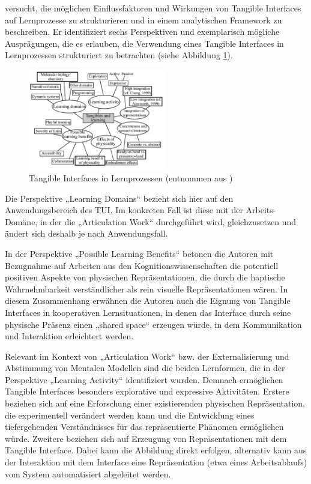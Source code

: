 \citet{Marshall07} versucht, die möglichen Einflussfaktoren und Wirkungen von Tangible Interfaces auf Lernprozesse zu strukturieren und in einem analytischen Framework zu beschreiben. Er identifiziert sechs Perspektiven und exemplarisch mögliche Ausprägungen, die es erlauben, die Verwendung eines Tangible Interfaces in Lernprozessen strukturiert zu betrachten (siehe Abbildung \ref{fig:img_ImplementierungUeberblick_marshall_tui_learning}). 

\begin{figure}[htbp]
	\centering
		\includegraphics[width=6cm]{img/ImplementierungUeberblick/marshall_tui_learning.png}
	\caption[Tangible Interfaces in Lernprozessen]{Tangible Interfaces in Lernprozessen (entnommen aus \citet{Marshall07})}
	\label{fig:img_ImplementierungUeberblick_marshall_tui_learning}
\end{figure}

Die Perspektive „Learning Domains“ bezieht sich hier auf den Anwendungsbereich des \gls{TUI}. Im konkreten Fall ist diese mit der Arbeits-Domäne, in der die „Articulation Work“ durchgeführt wird, gleichzusetzen und ändert sich deshalb je nach Anwendungsfall.

In der Perspektive „Possible Learning Benefits“ betonen die Autoren mit Bezugnahme auf Arbeiten aus den Kognitionswissenschaften die potentiell positiven Aspekte von physischen Repräsentationen, die durch die haptische Wahrnehmbarkeit verständlicher als rein visuelle Repräsentationen wären. In diesem Zusammenhang erwähnen die Autoren auch die Eignung von Tangible Interfaces in kooperativen Lernsituationen, in denen das Interface durch seine physische Präsenz einen „shared space“ erzeugen würde, in dem Kommunikation und Interaktion erleichtert werden.

Relevant im Kontext von „Articulation Work“ bzw. der Externalisierung und Abstimmung von Mentalen Modellen sind die beiden Lernformen, die in der Perspektive „Learning Activity“ identifiziert wurden. Demnach ermöglichen Tangible Interfaces besonders explorative und expressive Aktivitäten. Erstere beziehen sich auf eine Erforschung einer existierenden physischen Repräsentation, die experimentell verändert werden kann und die Entwicklung eines tiefergehenden Verständnisses für das repräsentierte Phänomen ermöglichen würde. Zweitere beziehen sich auf Erzeugung von Repräsentationen mit dem Tangible Interface. Dabei kann die Abbildung direkt erfolgen, alternativ kann aus der Interaktion mit dem Interface eine Repräsentation (etwa eines Arbeitsablaufs) vom System automatisiert abgeleitet werden.

